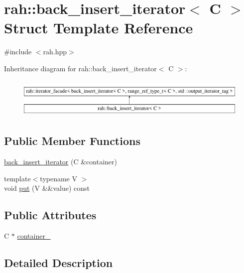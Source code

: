 \hypertarget{structrah_1_1back__insert__iterator}{}\section{rah\+::back\+\_\+insert\+\_\+iterator$<$ C $>$ Struct Template Reference}
\label{structrah_1_1back__insert__iterator}


{\ttfamily \#include $<$rah.\+hpp$>$}

Inheritance diagram for rah\+::back\+\_\+insert\+\_\+iterator$<$ C $>$\+:\begin{figure}[H]
\begin{center}
\leavevmode
\includegraphics[height=1.931034cm]{structrah_1_1back__insert__iterator}
\end{center}
\end{figure}
\subsection*{Public Member Functions}
\begin{DoxyCompactItemize}
\item 
\mbox{\hyperlink{structrah_1_1back__insert__iterator_a7c208b6bee5af4ca1f87a0a52df8069c}{back\+\_\+insert\+\_\+iterator}} (C \&container)
\item 
{\footnotesize template$<$typename V $>$ }\\void \mbox{\hyperlink{structrah_1_1back__insert__iterator_a5af149b87aebf5ced8a4143afe79ad50}{put}} (V \&\&value) const
\end{DoxyCompactItemize}
\subsection*{Public Attributes}
\begin{DoxyCompactItemize}
\item 
C $\ast$ \mbox{\hyperlink{structrah_1_1back__insert__iterator_a9abb383f80748b5baba2ecd6bff83056}{container\+\_\+}}
\end{DoxyCompactItemize}


\subsection{Detailed Description}
